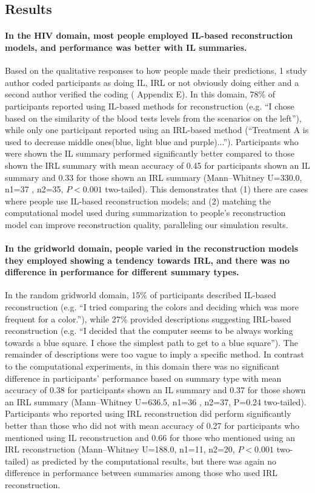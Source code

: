 \documentclass{article}
\begin{document}
\subsection{Results}
\paragraph{In the HIV domain, most people employed IL-based reconstruction models, and performance was better with IL summaries.} Based on the qualitative responses to how people made their predictions, 1 study author coded participants as doing IL, IRL or not obviously doing either and a second author verified the coding (\cite{lage2019policysummarization} Appendix E). In this domain, 78\% of participants reported using IL-based methods for reconstruction (e.g. ``I chose based on the similarity of the blood tests levels from the scenarios on the left''), while only one participant reported using an IRL-based method (``Treatment A is used to decrease middle ones(blue, light blue and purple)...''). Participants who were shown the IL summary performed significantly better compared to those shown the IRL summary with mean accuracy of 0.45 for participants shown an IL summary and 0.33 for those shown an IRL summary (Mann–Whitney U=330.0, n1=37 , n2=35, $P<0.001$ two-tailed). This demonstrates that (1) there are cases where people use IL-based reconstruction models; and (2) matching the computational model used during summarization to people's reconstruction model can improve reconstruction quality, paralleling our simulation results.

\paragraph{In the gridworld domain, people varied in the reconstruction models they employed showing a tendency towards IRL, and there was no difference in performance for different summary types.} In the random gridworld domain, 15\% of participants described IL-based reconstruction (e.g. ``I tried comparing the colors and deciding which was more frequent for a color.''), while 27\% provided descriptions suggesting IRL-based reconstruction (e.g. ``I decided that the computer seems to be always working towards a blue square. I chose the simplest path to get to a blue square''). The remainder of descriptions were too vague to imply a specific method. In contrast to the computational experiments, in this domain there was no significant difference in participants' performance based on summary type with mean accuracy of 0.38 for participants shown an IL summary and 0.37 for those shown an IRL summary (Mann–Whitney U=636.5, n1=36 , n2=37, P=0.24 two-tailed). Participants who reported using IRL reconstruction did perform significantly better than those who did not with mean accuracy of 0.27 for participants who mentioned using IL reconstruction and 0.66 for those who mentioned using an IRL reconstruction (Mann–Whitney U=188.0, n1=11, n2=20, $P<0.001$ two-tailed) as predicted by the computational results, but there was again no difference in performance between summaries among those who used IRL reconstruction. 
\end{document}
